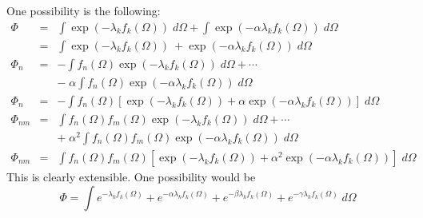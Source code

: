 \documentclass[12pt]{book}
\begin{document}
One possibility is the following:
\begin{eqnarray}
\Phi &=& \int \exp(-\lambda_k f_k(\Omega)) \;d\Omega + \int \exp(-\alpha \lambda_k f_k(\Omega)) \;d\Omega \\
&=&  \int \exp(-\lambda_k f_k(\Omega))\ + \exp(-\alpha \lambda_k f_k(\Omega)) \;d\Omega \\
\Phi_n &=& -\int f_n(\Omega) \exp(-\lambda_k f_k(\Omega)) \;d\Omega + \cdots \nonumber \\
 & & - \; \alpha \int f_n(\Omega) \exp(-\alpha \lambda_k f_k(\Omega)) \;d\Omega \\
\Phi_n &=& -\int f_n(\Omega) [ \exp(-\lambda_k f_k(\Omega)) + \alpha  \exp(-\alpha\lambda_k f_k(\Omega)) ] \;d
\Omega \\
\Phi_{nm} &=& \int f_n(\Omega) f_m(\Omega) \exp(-\lambda_k f_k(\Omega)) \;d\Omega + \cdots \nonumber \\
 & & + \; \alpha^2 \int f_n(\Omega) f_m(\Omega) \exp(-\alpha \lambda_k f_k(\Omega)) \;d\Omega \\
\Phi_{nm} &=& \!\int \! f_n(\Omega) f_m(\Omega) [ \exp(-\lambda_k f_k(\Omega)) + \alpha^2  \exp(-\alpha
\lambda_k 
f_k(\Omega)) ] \;d \Omega 
\end{eqnarray}
This is clearly extensible.  One possibility would be
\begin{equation}
\Phi = \int e^{-\lambda_k f_k(\Omega)} +  e^{-\alpha \lambda_k f_k(\Omega)} + 
e^{-\beta \lambda_k f_k(\Omega)} + e^{-\gamma \lambda_k f_k(\Omega)} \; d\Omega
\end{equation} 
\printindex

\cleardoublepage




\end{document}
